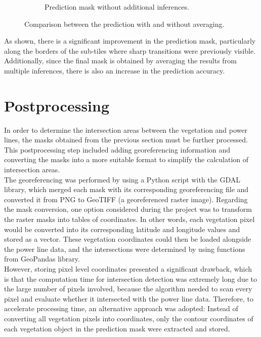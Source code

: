 \begin{figure}[H]
\begin{subfigure}{0.49\textwidth}
\caption{Prediction mask without additional inferences.}
\label{fig:right}
\end{subfigure}
\caption{Comparison between the prediction with and without averaging.}
\label{fig:combined}
\end{figure}

As shown, there is a significant improvement in the prediction mask, particularly along the borders of the sub-tiles where sharp transitions were previously visible. Additionally, since the final mask is obtained by averaging the results from multiple inferences, there is also an increase in the prediction accuracy.\\


\section{Postprocessing}

In order to determine the intersection areas between the vegetation and power lines, the masks obtained from the previous section must be further processed. This postprocessing step included adding georeferencing information and converting the masks into a more suitable format to simplify the calculation of intersection areas.\\

The georeferencing was performed by using a Python script with the GDAL library, which merged each mask with its corresponding georeferencing file and converted it from PNG to GeoTIFF (a georeferenced raster image). Regarding the mask conversion, one option considered during the project was to transform the raster masks into tables of coordinates. In other words, each vegetation pixel would be converted into its corresponding latitude and longitude values and stored as a vector. These vegetation coordinates could then be loaded alongside the power line data, and the intersections were determined by using functions from GeoPandas library.\\

However, storing pixel level coordinates presented a significant drawback, which is that the computation time for intersection detection was extremely long due to the large number of pixels involved, because the algorithm needed to scan every pixel and evaluate whether it intersected with the power line data. Therefore, to accelerate processing time, an alternative approach was adopted: Instead of converting all vegetation pixels into coordinates, only the contour coordinates of each vegetation object in the prediction mask were extracted and stored.\\

